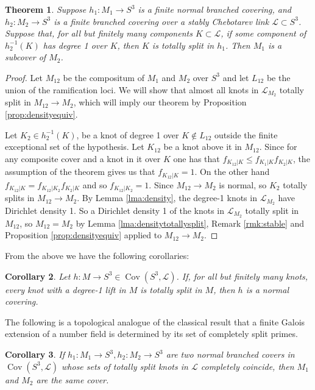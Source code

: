 \documentclass{amsart}
\theoremstyle{plain}
\newtheorem{theorem}{Theorem}[section]
\theoremstyle{definition}
\theoremstyle{plain}
\theoremstyle{plain}
\newtheorem{corollary}[theorem]{Corollary}
\theoremstyle{plain}
\theoremstyle{remark}
\theoremstyle{remark}
\theoremstyle{plain}
\theoremstyle{definition}
\theoremstyle{plain}
\DeclareMathOperator{\Cov}{\mathrm{Cov}}
\theoremstyle{plain}
\theoremstyle{plain}
\numberwithin{equation}{section}
\begin{document}
\begin{theorem}\label{thm:subcover}
Suppose $h_1: M_1 \to S^3$ is a finite normal branched covering, and $h_2: M_2 \to S^3$ is a finite branched covering over a stably Chebotarev link $\mathcal{L} \subset S^3$. Suppose that, for all but finitely many components $K \subset \mathcal L$, if some component of $h_2^{-1}(K)$ has degree 1 over $K$, then $K$ is totally split in $h_1$. Then $M_1$ is a subcover of $M_2$. 
\end{theorem}

\begin{proof}
Let $M_{12}$ be the compositum of $M_1$ and $M_2$ over $S^3$ and let $L_{12}$ be the union of the ramification loci. We will show that almost all knots in $\mathcal{L}_{M_2}$ totally split in $M_{12} \to M_2$, which will imply our theorem by Proposition \ref{prop:densityequiv}. 

\medskip

Let $K_2 \in h_2^{-1}(K)$, be a knot of degree 1 over $K \notin L_{12}$ outside the finite exceptional set of the hypothesis. Let $K_{12}$ be a knot above it in $M_{12}$. Since for any composite cover and a knot in it over $K$ one has that $f_{K_{12}|K}\leq f_{K_1|K}f_{K_2|K}$, the assumption of the theorem gives us that $f_{K_{12}|K}=1$. On the other hand $f_{K_{12}|K}=f_{K_{12}|K_2}f_{K_{2}|K}$ and so $f_{K_{12}|K_2}=1$. Since $M_{12} \to M_2$ is normal, so $K_2$ totally splits in $M_{12} \to M_2$. By Lemma \ref{lma:density}, the degree-1 knots in $\mathcal{L}_{M_2}$ have Dirichlet density 1. So a Dirichlet density 1 of the knots in $\mathcal{L}_{M_2}$ totally split in $M_{12}$, so $M_{12} = M_2$ by Lemma \ref{lma:densitytotallysplit}, Remark \ref{rmk:stable} and Proposition \ref{prop:densityequiv} applied to $M_{12} \to M_2$. 
\end{proof}

From the above we have the following corollaries:

\begin{corollary}\label{cor:normal}
Let $h: M \to S^3 \in \Cov(S^3, \mathcal{L})$. If, for all but finitely many knots, every knot with a degree-1 lift in $M$ is totally split in $M$, then $h$ is a normal covering.
\end{corollary}

The following is a topological analogue of the classical result that a finite Galois extension of a number field is determined by its set of completely split primes.

\begin{corollary}\label{cor:first}
If $h_1: M_1 \to S^3, h_2: M_2 \to S^3$ are two normal branched covers in $\Cov(S^3, \mathcal{L})$ whose sets of totally split knots in $\mathcal{L}$ completely coincide, then $M_1$ and $M_2$ are the same cover.
\end{corollary}
\end{document}
